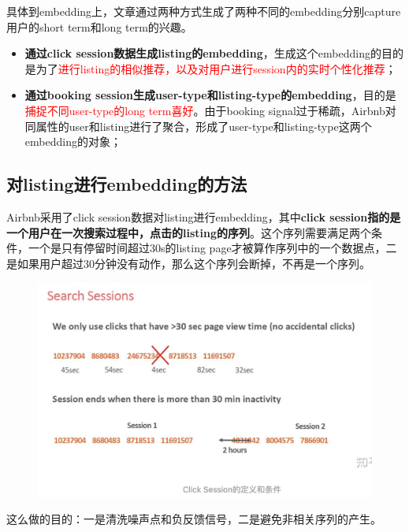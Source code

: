\documentclass[12pt]{article}
\begin{document}
具体到embedding上，文章通过两种方式生成了两种不同的embedding分别capture用户的short term和long term的兴趣。
\begin{itemize}
\setlength{\itemsep}{0pt}
\setlength{\parsep}{0pt}
\setlength{\parskip}{0pt}
    \item \textbf{通过click session数据生成listing的embedding}，生成这个embedding的目的是为了\textcolor{red}{进行listing的相似推荐，以及对用户进行session内的实时个性化推荐}；
    \item \textbf{通过booking session生成user-type和listing-type的embedding}，目的是\textcolor{red}{捕捉不同user-type的long term喜好}。由于booking signal过于稀疏，Airbnb对同属性的user和listing进行了聚合，形成了user-type和listing-type这两个embedding的对象；
\end{itemize}

\subsection{对listing进行embedding的方法}
Airbnb采用了click session数据对listing进行embedding，其中\textbf{click session指的是一个用户在一次搜索过程中，点击的listing的序列}。这个序列需要满足两个条件，一个是只有停留时间超过30s的listing page才被算作序列中的一个数据点，二是如果用户超过30分钟没有动作，那么这个序列会断掉，不再是一个序列。

\begin{figure}[H]
    \centering
    \includegraphics[width=1\textwidth]{fig/Airbnb_Click_Sessions.png}
\end{figure}

这么做的目的：一是清洗噪声点和负反馈信号，二是避免非相关序列的产生。
\end{document}

